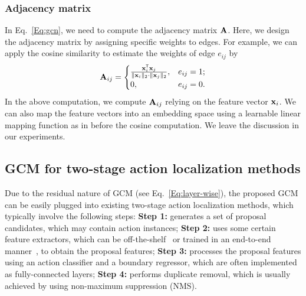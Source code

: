 \documentclass[10pt,journal,compsoc]{IEEEtran}
\begin{document}
	\subsubsection{Adjacency matrix}
	In Eq.~\eqref{Eq:gcn}, we need to compute the adjacency matrix ${\bf A}$.
	Here, we design the adjacency matrix by
	assigning specific weights to edges. For example, we can apply the cosine similarity to estimate the weights of edge $e_{ij}$ by
	\begin{equation}
	\label{Eq:adj}
	{\bf A}_{ij} =
	\begin{cases}
	\frac{{\bf x}_{i}^{{\sf T}}{\bf x}_{j}}{\|{\bf x}_{i}\|_{2}\cdot\|{\bf x}_{j}\|_{2}}, &  e_{ij}=1; \\
	0, & e_{ij}=0.
	\end{cases}
	\end{equation}
	In the above computation, we compute ${\bf A}_{ij}$ relying on the feature vector ${\bf x}_{i}$. We can also map the feature vectors 
	into an embedding space using a learnable linear mapping function as in \cite{wang2018non}
	before the cosine computation. We leave the discussion in our experiments. 
	
	
	\subsection{GCM for two-stage action localization methods}\label{Sec:module}
	
	Due to the residual nature of GCM (see Eq.~\eqref{Eq:layer-wise}), the proposed
	GCM can be easily plugged into existing two-stage action localization methods, which typically involve the following steps:
	\textbf{Step 1:} generates a set of proposal candidates, which may contain action instances; \textbf{Step 2:} uses some certain feature extractors, which can be off-the-shelf~\cite{gao2017cascaded} or trained in an end-to-end manner~\cite{xu2017r}, to obtain the proposal features; \textbf{Step 3:} processes the proposal features using an action classifier and a boundary regressor, which are often implemented as fully-connected layers; \textbf{Step 4:} performs duplicate removal, which is usually achieved by using non-maximum suppression (NMS).
	
\end{document}
